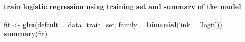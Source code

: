 \documentclass[]{article}
\newenvironment{Shaded}{\begin{snugshade}}{\end{snugshade}}
\newcommand{\DataTypeTok}[1]{\textcolor[rgb]{0.13,0.29,0.53}{#1}}
\newcommand{\KeywordTok}[1]{\textcolor[rgb]{0.13,0.29,0.53}{\textbf{#1}}}
\newcommand{\NormalTok}[1]{#1}
\newcommand{\OperatorTok}[1]{\textcolor[rgb]{0.81,0.36,0.00}{\textbf{#1}}}
\newcommand{\StringTok}[1]{\textcolor[rgb]{0.31,0.60,0.02}{#1}}
\let\oldparagraph\paragraph
\renewcommand{\paragraph}[1]{\oldparagraph{#1}\mbox{}}
\begin{document}
\hypertarget{train-logistic-regression-using-training-set-and-summary-of-the-model}{%
\paragraph{train logistic regression using training set and summary of
the
model}\label{train-logistic-regression-using-training-set-and-summary-of-the-model}}

\begin{Shaded}
\begin{Highlighting}[]
\NormalTok{fit <-}\StringTok{ }\KeywordTok{glm}\NormalTok{(default}\OperatorTok{~}\NormalTok{., }\DataTypeTok{data=}\NormalTok{train_set, }\DataTypeTok{family =} \KeywordTok{binomial}\NormalTok{(}\DataTypeTok{link =} \StringTok{'logit'}\NormalTok{))}
\KeywordTok{summary}\NormalTok{(fit)}
\end{Highlighting}
\end{Shaded}
\end{document}
